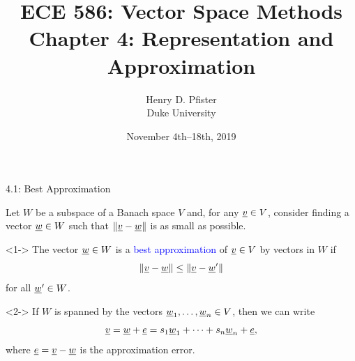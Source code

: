 \documentclass[10pt,letterpaper,english]{beamer}
\newif\ifslow
\begin{document}
\ifslow

\title{ECE 586: Vector Space Methods \\ Chapter 4: Representation and Approximation}
\author{Henry D. Pfister \\ Duke University}
\date{November 4th--18th, 2019}
\maketitle

\begin{frame}{4.1: Best Approximation}

Let $W$ be a subspace of a Banach space $V$ and, for any $\underline{v} \in V$, consider finding a vector $\underline{w} \in W$ such that $\left\| \underline{v} - \underline{w} \right\|$ is as small as possible.
\begin{definition}<1->
The vector $\underline{w} \in W$ is a \textcolor{blue}{best approximation} of $\underline{v} \in V$ by vectors in $W$ if
\begin{equation*}
\left\| \underline{v} - \underline{w} \right\| \leq \left\| \underline{v} - \underline{w}' \right\|
\end{equation*}
for all $\underline{w}' \in W$.
\end{definition}

\begin{example}<2->
If $W$ is spanned by the vectors $\underline{w}_1, \ldots, \underline{w}_n \in V$, then we can write
\begin{equation*}
\underline{v} = \underline{w} + \underline{e} = s_1 \underline{w}_1 + \cdots + s_n \underline{w}_n + \underline{e},
\end{equation*}
where $\underline{e} = \underline{v}-\underline{w}$ is the approximation error.
\end{example}
\end{frame}
\end{document}
